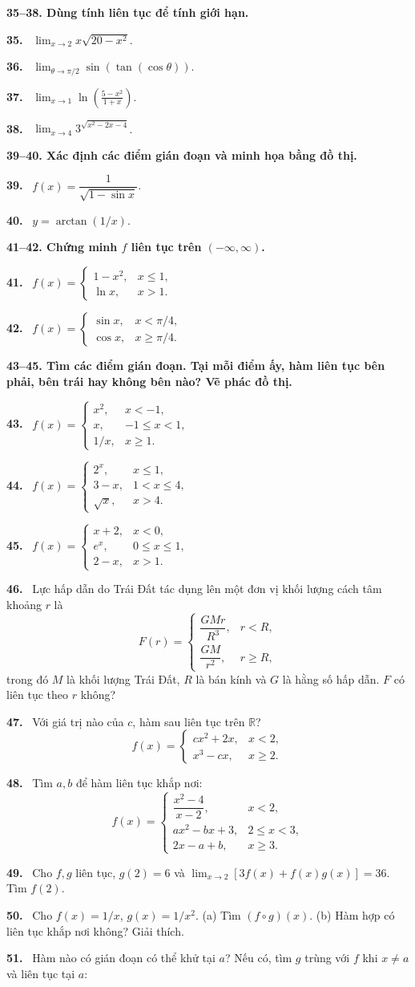 \documentclass[12pt,a4paper]{article}
\newcommand{\bt}[1]{\par\smallskip\noindent\textbf{#1.}\ }
\newcommand{\group}[1]{\par\medskip\noindent\textbf{#1}\par\nopagebreak[4]}
\begin{document}
\group{35–38. Dùng tính liên tục để tính giới hạn.}
\bt{35} $\displaystyle\lim_{x\to2}x\sqrt{20-x^2}$.
\bt{36} $\displaystyle\lim_{\theta\to\pi/2}\sin(\tan(\cos\theta))$.
\bt{37} $\displaystyle\lim_{x\to1}\ln\left(\frac{5-x^2}{1+x}\right)$.
\bt{38} $\displaystyle\lim_{x\to4}3^{\sqrt{x^2-2x-4}}$.
\group{39–40. Xác định các điểm gián đoạn và minh họa bằng đồ thị.}
\bt{39} $f(x)=\dfrac1{\sqrt{1-\sin x}}$.
\bt{40} $y=\arctan(1/x)$.
\group{41–42. Chứng minh $f$ liên tục trên $(-\infty,\infty)$.}
\bt{41} $f(x)=\begin{cases}1-x^2,&x\le1,\\\ln x,&x>1.\end{cases}$
\bt{42} $f(x)=\begin{cases}\sin x,&x<\pi/4,\\\cos x,&x\ge\pi/4.\end{cases}$
\group{43–45. Tìm các điểm gián đoạn. Tại mỗi điểm ấy, hàm liên tục bên phải, bên trái hay không bên nào? Vẽ phác đồ thị.}
\bt{43} $f(x)=\begin{cases}x^2,&x<-1,\\x,&-1\le x<1,\\1/x,&x\ge1.\end{cases}$
\bt{44} $f(x)=\begin{cases}2^x,&x\le1,\\3-x,&1<x\le4,\\\sqrt{x},&x>4.\end{cases}$
\bt{45} $f(x)=\begin{cases}x+2,&x<0,\\e^x,&0\le x\le1,\\2-x,&x>1.\end{cases}$
\bt{46} Lực hấp dẫn do Trái Đất tác dụng lên một đơn vị khối lượng cách tâm khoảng $r$ là
\[F(r)=\begin{cases}\dfrac{GMr}{R^3},&r<R,\\\dfrac{GM}{r^2},&r\ge R,\end{cases}\]
trong đó $M$ là khối lượng Trái Đất, $R$ là bán kính và $G$ là hằng số hấp dẫn. $F$ có liên tục theo $r$ không?
\bt{47} Với giá trị nào của $c$, hàm sau liên tục trên $\mathbb R$?
\[f(x)=\begin{cases}cx^2+2x,&x<2,\\x^3-cx,&x\ge2.\end{cases}\]
\bt{48} Tìm $a,b$ để hàm liên tục khắp nơi:
\[f(x)=\begin{cases}\dfrac{x^2-4}{x-2},&x<2,\\ax^2-bx+3,&2\le x<3,\\2x-a+b,&x\ge3.\end{cases}\]
\bt{49} Cho $f,g$ liên tục, $g(2)=6$ và $\lim_{x\to2}[3f(x)+f(x)g(x)]=36$. Tìm $f(2)$.
\bt{50} Cho $f(x)=1/x$, $g(x)=1/x^2$. (a) Tìm $(f\circ g)(x)$. (b) Hàm hợp có liên tục khắp nơi không? Giải thích.
\bt{51} Hàm nào có gián đoạn có thể khử tại $a$? Nếu có, tìm $g$ trùng với $f$ khi $x\ne a$ và liên tục tại $a$:
\end{document}
